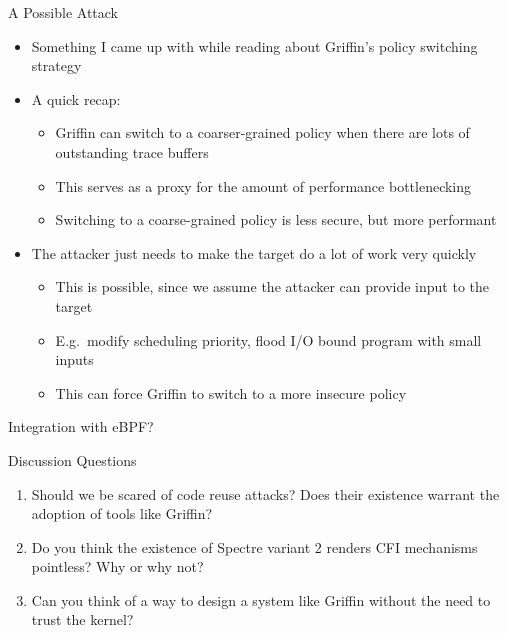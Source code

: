 \documentclass[12pt, dvipsnames, aspectratio=169]{beamer}
\begin{document}
\begin{frame}[c]{A Possible Attack}{}
  \begin{itemize}
    \item Something I came up with while reading about Griffin's policy switching strategy

    \vfill
    \item A quick recap:
    \begin{itemize}
      \item Griffin can switch to a coarser-grained policy when there are lots of\\outstanding trace buffers
      \item This serves as a proxy for the amount of performance bottlenecking
      \item Switching to a coarse-grained policy is less secure, but more performant
    \end{itemize}

    \vfill
    \item The attacker just needs to make the target do a lot of work very quickly
    \begin{itemize}
      \item This is possible, since we assume the attacker can provide input to the target
      \item E.g.~modify scheduling priority, flood I/O bound program with small inputs
      \item This can force Griffin to switch to a more insecure policy
    \end{itemize}
  \end{itemize}
\end{frame}

%
%
%

\begin{frame}[c]{Integration with eBPF?}{}

\end{frame}

\begin{frame}[c]{Discussion Questions}{}
  \begin{enumerate}
    \item Should we be scared of code reuse attacks? Does their existence warrant the adoption of tools like Griffin?

    \vfill
    \item Do you think the existence of Spectre variant 2 renders CFI mechanisms pointless? Why or why not?

    \vfill
    \item Can you think of a way to design a system like Griffin without the need to trust the kernel?
  \end{enumerate}
\end{frame}
\end{document}
